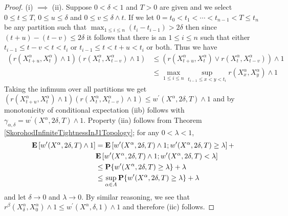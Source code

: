 \begin{proof}
(i) $\implies$ (ii).  Suppose $0 < \delta < 1$ and $T > 0$ are given and we select $0 \leq t \leq T$, 
$0 \leq u \leq \delta$ and $0 \leq v \leq \delta \wedge t$.  If we let $0=t_0 < t_1 < \dotsb < t_{n-1} < T \leq t_n$ be any partition such that $\max_{1 \leq i \leq n} (t_{i} - t_{i-1}) > 2\delta$ then since $(t+u) - (t-v) \leq 2\delta$ it follows that there is an $1 \leq i \leq n$ such that either $t_{i-1} \leq t-v < t < t_i$ or $t_{i-1} \leq t < t + u < t_i$ or both.  Thus we have
\begin{align*}
(r(X^\alpha_{t+u}, X^\alpha_t) \wedge 1) (r(X^\alpha_{t}, X^\alpha_{t -v}) \wedge 1)
&\leq (r(X^\alpha_{t+u}, X^\alpha_t) \vee r(X^\alpha_{t}, X^\alpha_{t -v})) \wedge 1 \\
&\leq \max_{1 \leq i \leq n} \sup_{t_{i-1} \leq x < y < t_{i}} r(X^\alpha_x,X^\alpha_y) \wedge 1
\end{align*}
Taking the infimum over all partitions we get $(r(X^\alpha_{t+u}, X^\alpha_t) \wedge 1) (r(X^\alpha_{t}, X^\alpha_{t -v}) \wedge 1) \leq w^{\prime}(X^\alpha, 2\delta, T) \wedge 1$ and by monotonicity of conditional expectation (iib) follows with $\gamma_{\alpha, \delta} = w^{\prime}(X^\alpha, 2\delta, T) \wedge 1$.  Property (iia) follows from Theorem \ref{SkorohodInfiniteTightnessInJ1Topology}; for any $0 < \lambda < 1$,
\begin{align*}
\textbf{E}\left[w^{\prime}(X^\alpha, 2\delta, T) \wedge 1\right] &= 
\textbf{E}\left[w^{\prime}(X^\alpha, 2\delta, T) \wedge 1 ; w^{\prime}(X^\alpha, 2\delta, T) \geq \lambda\right] + \\
&\textbf{E}\left[w^{\prime}(X^\alpha, 2\delta, T) \wedge 1 ; w^{\prime}(X^\alpha, 2\delta, T) < \lambda\right] \\
&\leq \textbf{P}\{w^{\prime}(X^\alpha, 2\delta, T) \geq \lambda\} + \lambda \\
&\leq \sup_{\alpha \in A} \textbf{P}\{w^{\prime}(X^\alpha, 2\delta, T) \geq \lambda\} + \lambda \\
\end{align*}
and let $\delta \to 0$ and $\lambda \to 0$.  By similar reasoning,  we see that $r^\beta(X^\alpha_\delta, X^\alpha_0) \wedge 1 \leq w^{\prime}(X^\alpha, \delta, 1) \wedge 1$ and therefore (iic) follows.


\end{proof}
